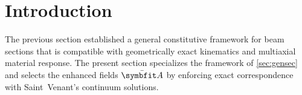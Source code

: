 





\section{Introduction}

The previous section established a general constitutive framework for beam sections that is compatible with geometrically exact kinematics and multiaxial material response. 
The present section specializes the framework of \cref{sec:gensec} and selects the enhanced fields \(\EnhanShapes\) by enforcing exact correspondence with Saint~Venant's continuum solutions. 


